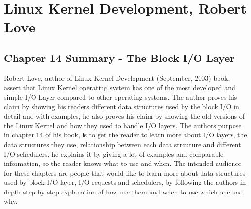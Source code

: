 \documentclass[letterpaper,10pt,draftclsnofoot,onecolumn]{IEEEtran}
\begin{document}


	
\section*{Linux Kernel Development, Robert Love}
\subsection*{Chapter 14 Summary - The Block I/O Layer}

Robert Love, author of Linux Kernel Development (September, 2003) book, assert that Linux Kernel operating system has one of the most developed and simple I/O Layer compared to other operating systems. The author proves his claim by showing his readers different data structures used by the block I/O in detail and with examples, he also proves his claim by showing the old versions of the Linux Kernel and how they used to handle I/O layers. The author\textquotesingle s purpose in chapter 14 of his book, is to get the reader to learn more about I/O layers, the data structures they use, relationship between each data strcuture and different I/O schedulers, he explains it by giving a lot of examples and comparable information, so the reader knows what to use and when. The intended audience for these chapters are people that would like to learn more about data structures used by block I/O layer, I/O requests and schedulers, by following the author\textquotesingle s in depth step-by-step explanation of how use them and when to use which one and why.
\end{document}
